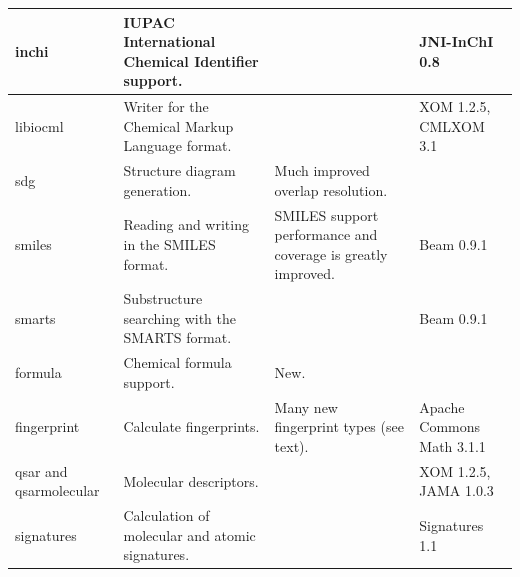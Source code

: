 \documentclass[10pt]{bmcart}
\begin{document}
\begin{backmatter}
\begin{minipage}{1\textwidth}
\begin{tabular}{lp{3cm}p{3cm}l}
  inchi                      & IUPAC International Chemical Identifier support. & & JNI-InChI 0.8~\cite{Spjuth2013}  \\ \hline
  libiocml                   & Writer for the Chemical Markup Language format. & & XOM 1.2.5, CMLXOM 3.1~\cite{Murray-Rust2011} \\ \hline
  sdg                        & Structure diagram generation.  & Much improved overlap resolution. & \\ \hline
  smiles                     & Reading and writing in the SMILES format. & SMILES support performance and coverage is greatly improved. & Beam 0.9.1~\cite{Beam} \\ \hline
  smarts                     & Substructure searching with the SMARTS format. & & Beam 0.9.1~\cite{Beam} \\ \hline
  formula                    & Chemical formula support. & New. & \\ \hline
  fingerprint                & Calculate fingerprints. & Many new fingerprint types (see text). & Apache Commons Math 3.1.1 \\ \hline
  qsar and qsarmolecular                       & Molecular descriptors.  & & XOM 1.2.5, JAMA 1.0.3~\cite{Hicklin2012} \\ \hline
  signatures                 & Calculation of molecular and atomic signatures. & & Signatures 1.1 \\ \hline %
    \end{tabular}
    \end{minipage}


\end{backmatter}
\end{document}
